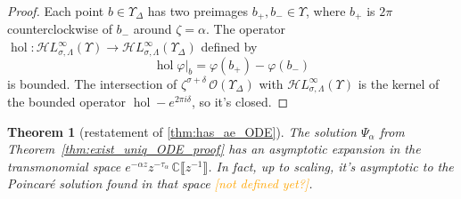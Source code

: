 \documentclass{article}
\newcommand{\singexp}[2]{\mathcal{H}L^\infty_{#1, #2}}
\newcommand{\maps}{\colon}
\newcommand{\C}{\mathbb{C}}
\DeclareMathOperator{\hol}{hol}
\theoremstyle{definition}
\theoremstyle{plain}
\newtheorem{theorem}{Theorem}[section]
\begin{document}
\begin{proof}
Each point $b \in \Upsilon_\Delta$ has two preimages $b_+, b_- \in \Upsilon$, where $b_+$ is $2\pi$ counterclockwise of $b_-$ around $\zeta = \alpha$. The operator $\hol \maps \singexp{\sigma}{\Lambda}(\Upsilon) \to \singexp{\sigma}{\Lambda}(\Upsilon_\Delta)$ defined by
\[ \hol \varphi \big|_b = \varphi(b_+) - \varphi(b_-) \]
is bounded. The intersection of $\zeta^{\sigma + \delta}\,\mathcal{O}(\Upsilon_\Delta)$ with $\singexp{\sigma}{\Lambda}(\Upsilon)$ is the kernel of the bounded operator $\hol - e^{2\pi i \delta}$, so it's closed.
\end{proof}
\begin{theorem}[restatement of \ref{thm:has_ae_ODE}]
The solution $\Psi_\alpha$ from Theorem~\ref{thm:exist_uniq_ODE_proof} has an asymptotic expansion in the transmonomial space $e^{-\alpha z} z^{-\tau_\alpha}\,\C \llbracket z^{-1} \rrbracket$. In fact, up to scaling, it's asymptotic to the Poincar\'{e} solution found in that space \textcolor{orange}{[not defined yet?]}.
\end{theorem}
\end{document}
